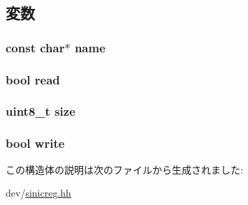 \subsection{変数}
\hypertarget{structSinic_1_1Regs_1_1Info_a8f8f80d37794cde9472343e4487ba3eb}{
\subsubsection[{name}]{\setlength{\rightskip}{0pt plus 5cm}const char$\ast$ {\bf name}}}
\label{structSinic_1_1Regs_1_1Info_a8f8f80d37794cde9472343e4487ba3eb}
\hypertarget{structSinic_1_1Regs_1_1Info_af49a80be54293d8b153cd2a3dfd4e068}{
\subsubsection[{read}]{\setlength{\rightskip}{0pt plus 5cm}bool {\bf read}}}
\label{structSinic_1_1Regs_1_1Info_af49a80be54293d8b153cd2a3dfd4e068}
\hypertarget{structSinic_1_1Regs_1_1Info_ae5dc6ffcd9b7605c7787791e40cc6bb0}{
\subsubsection[{size}]{\setlength{\rightskip}{0pt plus 5cm}uint8\_\-t {\bf size}}}
\label{structSinic_1_1Regs_1_1Info_ae5dc6ffcd9b7605c7787791e40cc6bb0}
\hypertarget{structSinic_1_1Regs_1_1Info_ab4d8d1259f524270d625ab8933700d27}{
\subsubsection[{write}]{\setlength{\rightskip}{0pt plus 5cm}bool {\bf write}}}
\label{structSinic_1_1Regs_1_1Info_ab4d8d1259f524270d625ab8933700d27}


この構造体の説明は次のファイルから生成されました:\begin{DoxyCompactItemize}
\item 
dev/\hyperlink{sinicreg_8hh}{sinicreg.hh}\end{DoxyCompactItemize}
